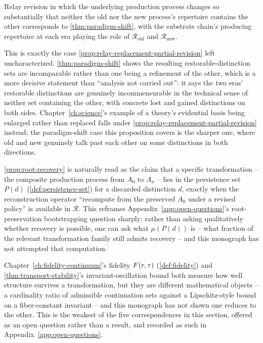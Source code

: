 \begin{proposition}
\label{prop:relay-replacement-paradigm-shift}
Relay revision in which the underlying production process changes so
substantially that neither the old nor the new process's repertoire
contains the other corresponds to \cref{thm:paradigm-shift}, with the
substrate chain's producing repertoire at each era playing the role of
$\mathcal{R}_{\mathrm{old}}$ and $\mathcal{R}_{\mathrm{new}}$.
\end{proposition}

\begin{proofsketch}
This is exactly the case \cref{prop:relay-replacement-partial-revision}
left uncharacterized. \cref{thm:paradigm-shift} shows the resulting
restorable-distinction sets are incomparable rather than one being a
refinement of the other, which is a more decisive statement than
``analysis not carried out'': it says the two eras' restorable
distinctions are genuinely incommensurable in the technical sense of
neither set containing the other, with concrete lost and gained
distinctions on both sides. Chapter~\ref{ch:science}'s example of a
theory's evidential basis being enlarged rather than replaced falls under
\cref{prop:relay-replacement-partial-revision} instead; the paradigm-shift
case this proposition covers is the sharper one, where old and new
genuinely talk past each other on some distinctions in both directions.
\end{proofsketch}

\begin{remark}
\label{rem:root-recovery-persistence-set}
\cref{prop:root-recovery} is naturally read as the claim that a specific
transformation -- the composite production process from $A_0$ to $A_n$ --
lies in the persistence set $P(d)$ (\cref{def:persistence-set}) for a
discarded distinction $d$, exactly when the reconstruction operator ``recompute
from the preserved $A_0$ under a revised policy'' is available in
$\mathcal{R}$. This reframes Appendix~\ref{app:open-questions}'s
root-preservation bootstrapping question sharply: rather than asking
qualitatively whether recovery is possible, one can ask what $\mu(P(d))$ is
-- what fraction of the relevant transformation family still admits
recovery -- and this monograph has not attempted that computation.
\end{remark}

\begin{remark}
\label{rem:fidelity-transport-open}
Chapter~\ref{ch:fidelity-continuum}'s fidelity $F(r,\tau)$
(\cref{def:fidelity}) and \cref{thm:transport-stability}'s invariant-oscillation
bound both measure how well structure survives a transformation, but they
are different mathematical objects -- a cardinality ratio of admissible
continuation sets against a Lipschitz-style bound on a fiber-constant
invariant -- and this monograph has not shown one reduces to the other. This
is the weakest of the five correspondences in this section, offered as an
open question rather than a result, and recorded as such in
Appendix~\ref{app:open-questions}.
\end{remark}


